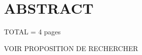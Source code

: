 %

\chapter*{ABSTRACT}\thispagestyle{headings}
%

TOTAL = 4 pages

VOIR PROPOSITION DE RECHERCHER


